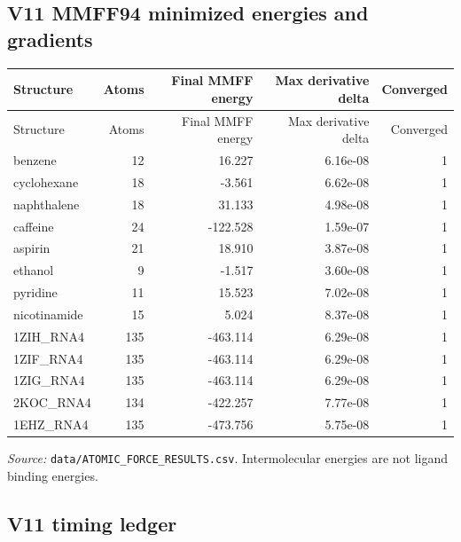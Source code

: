 \documentclass[11pt,a4paper]{article}
\begin{document}
\subsection{V11 MMFF94 minimized energies and gradients}

\begin{center}\small\begin{longtable}{lrrrr}
\toprule
Structure & Atoms & Final MMFF energy & Max derivative delta & Converged\\
\midrule
\endfirsthead
\toprule
Structure & Atoms & Final MMFF energy & Max derivative delta & Converged\\
\midrule
\endhead
benzene & 12 & 16.227 & 6.16e-08 & 1\\
cyclohexane & 18 & -3.561 & 6.62e-08 & 1\\
naphthalene & 18 & 31.133 & 4.98e-08 & 1\\
caffeine & 24 & -122.528 & 1.59e-07 & 1\\
aspirin & 21 & 18.910 & 3.87e-08 & 1\\
ethanol & 9 & -1.517 & 3.60e-08 & 1\\
pyridine & 11 & 15.523 & 7.02e-08 & 1\\
nicotinamide & 15 & 5.024 & 8.37e-08 & 1\\
1ZIH\_RNA4 & 135 & -463.114 & 6.29e-08 & 1\\
1ZIF\_RNA4 & 135 & -463.114 & 6.29e-08 & 1\\
1ZIG\_RNA4 & 135 & -463.114 & 6.29e-08 & 1\\
2KOC\_RNA4 & 134 & -422.257 & 7.77e-08 & 1\\
1EHZ\_RNA4 & 135 & -473.756 & 5.75e-08 & 1\\
\bottomrule
\end{longtable}
\end{center}
\textit{Source: } \texttt{data/ATOMIC\_FORCE\_RESULTS.csv}. Intermolecular energies are not ligand binding energies.
\subsection{V11 timing ledger}
\end{document}
